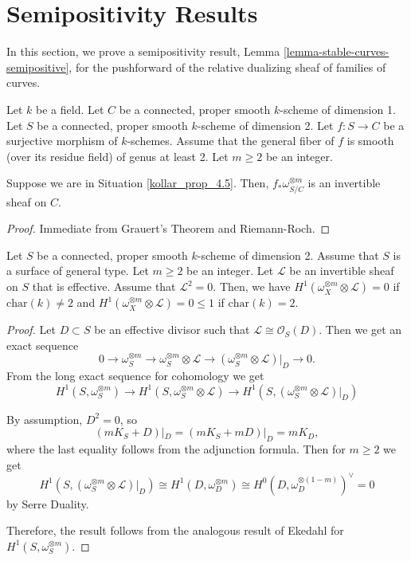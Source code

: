 \section{Semipositivity Results}
In this section, we prove a semipositivity result,
Lemma \ref{lemma-stable-curves-semipositive}, for the pushforward of the
relative dualizing sheaf of families of curves.

\begin{situation}\label{kollar_prop_4.5}
Let $k$ be a field.
Let $C$ be a connected, proper smooth $k$-scheme of dimension 1.
Let $S$ be a connected, proper smooth $k$-scheme of dimension 2.
Let $f:S\to C$ be a surjective morphism of $k$-schemes.
Assume that the general fiber of $f$ is smooth (over its residue field) of genus at least 2.
Let $m\ge2$ be an integer.
\end{situation}

\begin{lemma}\label{pushforward_invertible}
Suppose we are in Situation \ref{kollar_prop_4.5}.
Then, $f_*\omega_{S/C}^{\otimes m}$ is an invertible sheaf on $C$.
\end{lemma}

\begin{proof}
Immediate from Grauert's Theorem and Riemann-Roch.
\end{proof}


\begin{lemma}\label{ekedahl_corollary}
Let $S$ be a connected, proper smooth $k$-scheme of dimension 2.
Assume that $S$ is a surface of general type.
Let $m\ge2$ be an integer.
Let $\mathcal{L}$ be an invertible sheaf on $S$ that is effective.
Assume that $\mathcal{L}^2=0$.
Then, we have $H^1(\omega_X^{\otimes m}\otimes\mathcal{L})=0$ if $\mathrm{char}(k)\neq2$ and  $H^1(\omega_X^{\otimes m}\otimes\mathcal{L})=0\leq 1$ if $\mathrm{char}(k)=2$.
\end{lemma}
\begin{proof}
Let $D\subset S$ be an effective divisor such that $\mathcal{L}\cong\mathcal{O}_S(D)$.
Then we get an exact sequence
$$
0\to \omega_S^{\otimes m}\to \omega^{\otimes m}_S\otimes \mathcal{L}\to (\omega_S^{\otimes m}\otimes \mathcal{L})|_D\to 0.
$$
From the long exact sequence for cohomology we get
$$
H^1(S,\omega_S^{\otimes m})\to H^1(S,\omega_S^{\otimes m}\otimes \mathcal{L})\to H^1(S,(\omega_S^{\otimes m}\otimes \mathcal{L})|_D)
$$

By assumption, $D^2=0$, so
$$
(mK_S+D)|_D=(mK_S+mD)|_D=mK_D,
$$
where the last equality follows from the adjunction formula.
Then for $m\geq 2$ we get
$$
H^1(S,(\omega_S^{\otimes m}\otimes \mathcal{L})|_D)\cong H^1(D,\omega_D^{\otimes m})\cong H^0(D,\omega_D^{\otimes(1-m)})^\vee=0
$$
by Serre Duality.

Therefore, the result follows from the analogous result of Ekedahl for $H^{1}(S,\omega_S^{\otimes m})$.
\end{proof}




